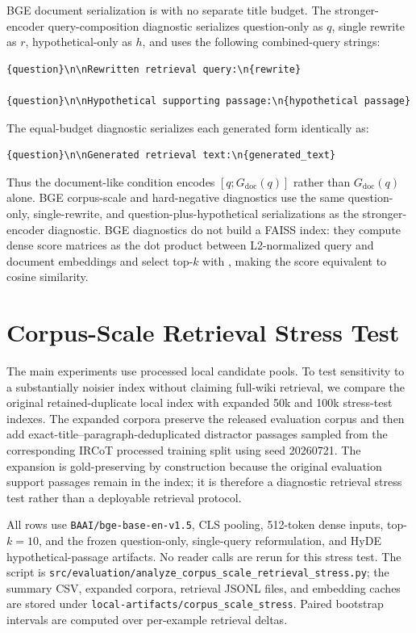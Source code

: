 \documentclass[pdflatex,sn-basic,Numbered]{sn-jnl}
\begin{document}
BGE document serialization is  with no separate title budget. The stronger-encoder query-composition diagnostic serializes question-only as $q$, single rewrite as $r$, hypothetical-only as $h$, and uses the following combined-query strings:
\begingroup\footnotesize
\begin{verbatim}
{question}\n\nRewritten retrieval query:\n{rewrite}

{question}\n\nHypothetical supporting passage:\n{hypothetical passage}
\end{verbatim}
\endgroup
The equal-budget diagnostic serializes each generated form identically as:
\begingroup\footnotesize
\begin{verbatim}
{question}\n\nGenerated retrieval text:\n{generated_text}
\end{verbatim}
\endgroup
Thus the document-like condition encodes $[q;G_{\mathrm{doc}}(q)]$ rather than $G_{\mathrm{doc}}(q)$ alone. BGE corpus-scale and hard-negative diagnostics use the same question-only, single-rewrite, and question-plus-hypothetical serializations as the stronger-encoder diagnostic. BGE diagnostics do not build a FAISS index: they compute dense score matrices as the dot product between L2-normalized query and document embeddings and select top-$k$ with , making the score equivalent to cosine similarity.

\section{Corpus-Scale Retrieval Stress Test}
\label{sec:supp_corpus_scale_stress}

The main experiments use processed local candidate pools. To test sensitivity to a substantially noisier index without claiming full-wiki retrieval, we compare the original retained-duplicate local index with expanded 50k and 100k stress-test indexes. The expanded corpora preserve the released evaluation corpus and then add exact-title--paragraph-deduplicated distractor passages sampled from the corresponding IRCoT processed training split using seed 20260721. The expansion is gold-preserving by construction because the original evaluation support passages remain in the index; it is therefore a diagnostic retrieval stress test rather than a deployable retrieval protocol.

All rows use \texttt{BAAI/bge-base-en-v1.5}, CLS pooling, 512-token dense inputs, top-$k=10$, and the frozen question-only, single-query reformulation, and HyDE hypothetical-passage artifacts. No reader calls are rerun for this stress test. The script is \texttt{src/evaluation/analyze\_corpus\_scale\_retrieval\_stress.py}; the summary CSV, expanded corpora, retrieval JSONL files, and embedding caches are stored under \texttt{local-artifacts/corpus\_scale\_stress}. Paired bootstrap intervals are computed over per-example retrieval deltas.
\end{document}
